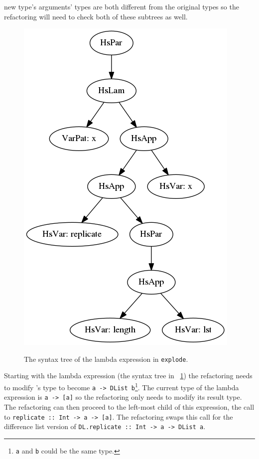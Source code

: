 \DIFaddend new type's arguments' types are both different from the original types so the refactoring will need to check both of these subtrees as well. 

\begin{figure}[h]
	\DIFdelbeginFL %
\DIFdelendFL \begin{center}
		\includegraphics[scale=.5]{graphVis/Chapter3/explodeLam.png}
	\end{center}
	\caption{The syntax tree of the lambda expression in \texttt{explode}.}\DIFaddbeginFL \label{explodeLam}
\DIFaddendFL \end{figure}

Starting with the lambda expression (the syntax tree in \DIFdelbegin {}\DIFdelend \DIFaddbegin {}\DIFaddend ~\ref{explodeLam}) the refactoring needs to modify \DIFdelbegin {}\DIFdelend \DIFaddbegin {}\DIFaddend 's type to become \texttt{a -> DList b}\footnote{\texttt{a} and \texttt{b} could be the same type.}. The current type of the lambda expression is \texttt{a -> [a]} so the refactoring only needs to modify its result type. The refactoring can then proceed to the left-most child of this expression, the call to \texttt{replicate :: Int -> a -> [a]}. The refactoring swaps this call for the difference list version of \texttt{DL.replicate :: Int -> a -> DList a}. 

